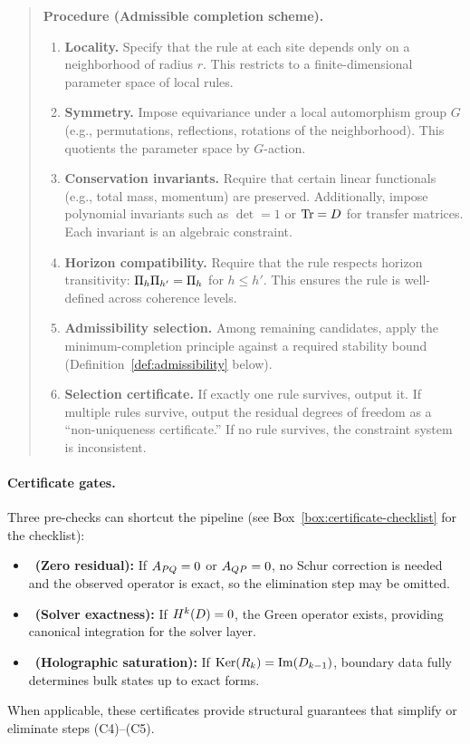 \begin{quote}
\small
\textbf{Procedure (Admissible completion scheme).}
\begin{enumerate}[label=\textbf{(C\arabic*)}, leftmargin=2.5em, itemsep=0.3em]
\item \textbf{Locality.}
Specify that the rule at each site depends only on a neighborhood of radius $r$.
This restricts to a finite-dimensional parameter space of local rules.

\item \textbf{Symmetry.}
Impose equivariance under a local automorphism group $G$ (e.g., permutations, reflections, rotations of the neighborhood).
This quotients the parameter space by $G$-action.

\item \textbf{Conservation invariants.}
Require that certain linear functionals (e.g., total mass, momentum) are preserved.
Additionally, impose polynomial invariants such as $\det = 1$ or $\mathrm{Tr} = D$ for transfer matrices.
Each invariant is an algebraic constraint.

\item \textbf{Horizon compatibility.}
Require that the rule respects horizon transitivity: $\Pi_{h} \Pi_{h'} = \Pi_{h}$ for $h \le h'$.
This ensures the rule is well-defined across coherence levels.

\item \textbf{Admissibility selection.}
Among remaining candidates, apply the minimum-completion principle against a required stability bound (Definition~\ref{def:admissibility} below).

\item \textbf{Selection certificate.}
If exactly one rule survives, output it.
If multiple rules survive, output the residual degrees of freedom as a ``non-uniqueness certificate.''
If no rule survives, the constraint system is inconsistent.
\end{enumerate}
\end{quote}

\paragraph{Certificate gates.}
\label{rem:certificate-gates}
Three pre-checks can shortcut the pipeline (see Box~\ref{box:certificate-checklist} for the checklist):
\begin{itemize}[itemsep=0.2em]
\item \CertA\ \textbf{(Zero residual):} If $A_{PQ} = 0$ or
      $A_{QP} = 0$, no Schur correction is needed and the observed
      operator is exact, so the elimination step may be omitted.
\item \CertB\ \textbf{(Solver exactness):} If $H^{k}(D) = 0$, the Green operator exists, providing canonical integration for the solver layer.
\item \CertC\ \textbf{(Holographic saturation):} If $\mathrm{Ker}(R_k) = \mathrm{Im}(D_{k-1})$, boundary data fully determines bulk states up to exact forms.
\end{itemize}
When applicable, these certificates provide structural guarantees that simplify or eliminate steps (C4)--(C5).

